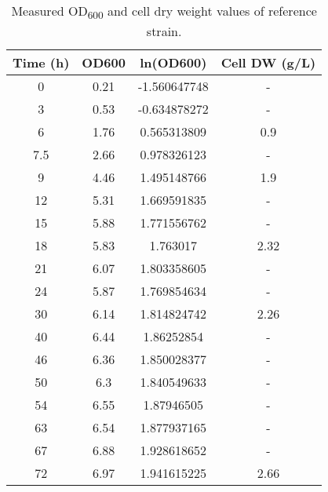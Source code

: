 \begin{table}[H]
\caption[Measured OD\textsubscript{600} and cell dry weight values of reference strain]{Measured OD\textsubscript{600} and cell dry weight values of reference strain.}
\begin{center}
  \begin{tabular}{cccc}

  \textbf{Time (h)} & \textbf{OD600} & \textbf{ln(OD600)} & \textbf{Cell DW (g/L)} \\
  \hline
  0                 & 0.21           & -1.560647748       & -                      \\
  3                 & 0.53           & -0.634878272       & -                      \\
  6                 & 1.76           & 0.565313809        & 0.9                    \\
  7.5               & 2.66           & 0.978326123        & -                      \\
  9                 & 4.46           & 1.495148766        & 1.9                    \\
  12                & 5.31           & 1.669591835        & -                      \\
  15                & 5.88           & 1.771556762        & -                      \\
  18                & 5.83           & 1.763017           & 2.32                   \\
  21                & 6.07           & 1.803358605        & -                      \\
  24                & 5.87           & 1.769854634        & -                      \\
  30                & 6.14           & 1.814824742        & 2.26                   \\
  40                & 6.44           & 1.86252854         & -                      \\
  46                & 6.36           & 1.850028377        & -                      \\
  50                & 6.3            & 1.840549633        & -                      \\
  54                & 6.55           & 1.87946505         & -                      \\
  63                & 6.54           & 1.877937165        & -                      \\
  67                & 6.88           & 1.928618652        & -                      \\
  72                & 6.97           & 1.941615225        & 2.66
  \end{tabular}
\label{table:experimental_OD600s_and_growths}
\end{center}
\end{table}
